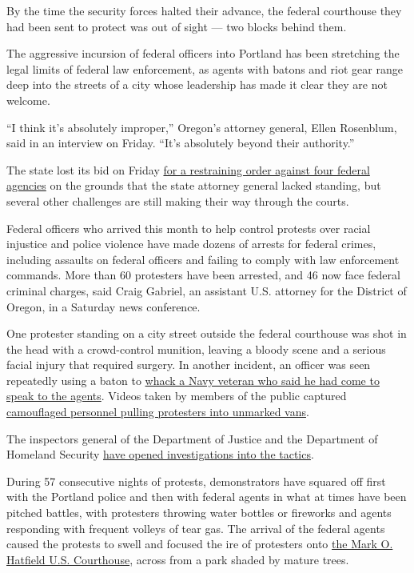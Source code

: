 By the time the security forces halted their advance, the federal
courthouse they had been sent to protect was out of sight --- two blocks
behind them.

The aggressive incursion of federal officers into Portland has been
stretching the legal limits of federal law enforcement, as agents with
batons and riot gear range deep into the streets of a city whose
leadership has made it clear they are not welcome.

``I think it's absolutely improper,'' Oregon's attorney general, Ellen
Rosenblum, said in an interview on Friday. ``It's absolutely beyond
their authority.''

The state lost its bid on Friday
\href{https://www.nytimes.com/2020/07/24/us/portland-federal-jurisdiction-court-judge.html}{for
a restraining order against four federal agencies} on the grounds that
the state attorney general lacked standing, but several other challenges
are still making their way through the courts.

Federal officers who arrived this month to help control protests over
racial injustice and police violence have made dozens of arrests for
federal crimes, including assaults on federal officers and failing to
comply with law enforcement commands. More than 60 protesters have been
arrested, and 46 now face federal criminal charges, said Craig Gabriel,
an assistant U.S. attorney for the District of Oregon, in a Saturday
news conference.

One protester standing on a city street outside the federal courthouse
was shot in the head with a crowd-control munition, leaving a bloody
scene and a serious facial injury that required surgery. In another
incident, an officer was seen repeatedly using a baton to
\href{https://www.nytimes.com/2020/07/20/us/portland-protests-navy-christopher-david.html}{whack
a Navy veteran who said he had come to speak to the agents}. Videos
taken by members of the public captured
\href{https://www.nytimes.com/2020/07/17/us/portland-protests.html}{camouflaged
personnel pulling protesters into unmarked vans}.

The inspectors general of the Department of Justice and the Department
of Homeland Security
\href{https://www.nytimes.com/2020/07/23/us/seattle-protests-feds.html}{have
opened investigations into the tactics}.

During 57 consecutive nights of protests, demonstrators have squared off
first with the Portland police and then with federal agents in what at
times have been pitched battles, with protesters throwing water bottles
or fireworks and agents responding with frequent volleys of tear gas.
The arrival of the federal agents caused the protests to swell and
focused the ire of protesters onto
\href{https://www.nytimes.com/2020/07/22/us/portland-protests-courthouse.html}{the
Mark O. Hatfield U.S. Courthouse}, across from a park shaded by mature
trees.

